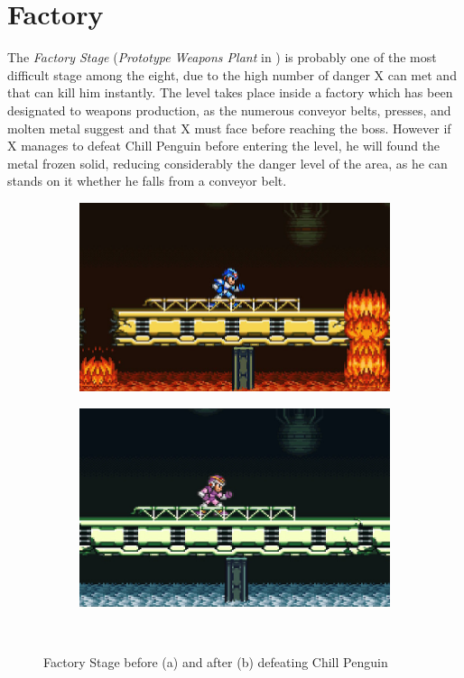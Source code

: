 \section{Factory} 
The \textit{Factory Stage} (\textit{Prototype Weapons Plant} in \mhx)  is probably one of the most difficult stage among the eight, due to the high number of danger X can met and that can kill him instantly. The level takes place inside a factory which has been designated to weapons production, as the numerous conveyor belts, presses, and molten metal suggest and that X must face before reaching the boss. However if X manages to defeat Chill Penguin before entering the level, he will found the metal frozen solid, reducing considerably the danger level of the area, as he can stands on it whether he falls from a conveyor belt.
\begin{figure}[h]
	\centering
	\begin{subfigure}{0.49\textwidth}
		\centering
		\includegraphics[width=\linewidth]{figures/X1/Flame_mammoth/Flame_fire.jpg}
		\caption{}
	\end{subfigure}
	\begin{subfigure}{0.465\textwidth}
		\centering
		\includegraphics[width=\linewidth]{figures/X1/Flame_mammoth/Flame_frozen.jpg}
		\caption{}
	\end{subfigure}\\
	\caption{Factory Stage before (a) and after (b)  defeating Chill Penguin}
\end{figure}

